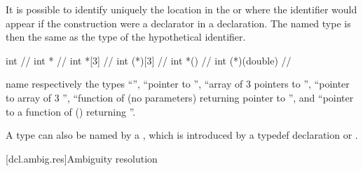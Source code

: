 It is possible to identify uniquely the location in the
or 
where the identifier would appear if the construction were a declarator
in a declaration.
The named type is then the same as the type of the
hypothetical identifier.
\begin{example}
\begin{codeblock}
int                 // 
int *               // 
int *[3]            // 
int (*)[3]          // 
int *()             // 
int (*)(double)     // 
\end{codeblock}
name respectively the types
``'',
``pointer to
'',
``array of 3 pointers to
'',
``pointer to array of 3
'',
``function of (no parameters) returning pointer to
'',
and ``pointer to a function of
()
returning
''.
\end{example}

\pnum
\begin{note}
A type can also be named by a ,
which is introduced by a typedef declaration
or .
\end{note}

[dcl.ambig.res]{Ambiguity resolution}%
%

